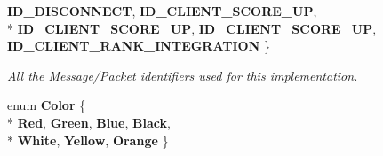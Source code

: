 \begin{DoxyCompactItemize}
{\bfseries I\-D\-\_\-\-D\-I\-S\-C\-O\-N\-N\-E\-C\-T}, 
{\bfseries I\-D\-\_\-\-C\-L\-I\-E\-N\-T\-\_\-\-S\-C\-O\-R\-E\-\_\-\-U\-P}, 
\\*
{\bfseries I\-D\-\_\-\-C\-L\-I\-E\-N\-T\-\_\-\-S\-C\-O\-R\-E\-\_\-\-U\-P}, 
{\bfseries I\-D\-\_\-\-C\-L\-I\-E\-N\-T\-\_\-\-S\-C\-O\-R\-E\-\_\-\-U\-P}, 
{\bfseries I\-D\-\_\-\-C\-L\-I\-E\-N\-T\-\_\-\-R\-A\-N\-K\-\_\-\-I\-N\-T\-E\-G\-R\-A\-T\-I\-O\-N}
 \}
\begin{DoxyCompactList}\small\item\em All the Message/\-Packet identifiers used for this implementation. \end{DoxyCompactList}\item 
enum {\bfseries Color} \{ \\*
{\bfseries Red}, 
{\bfseries Green}, 
{\bfseries Blue}, 
{\bfseries Black}, 
\\*
{\bfseries White}, 
{\bfseries Yellow}, 
{\bfseries Orange}
 \}
\end{DoxyCompactItemize}
